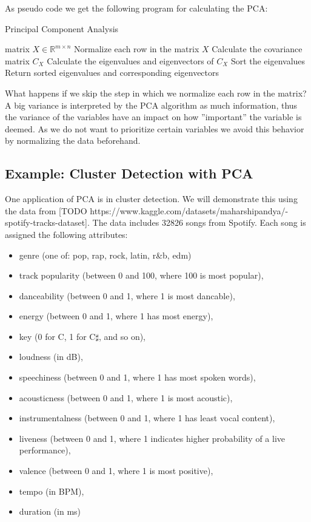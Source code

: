 \documentclass[a4paper]{IEEEtran}
\begin{document}
As pseudo code we get the following program for calculating the PCA:

\begin{algorithm}
	\caption{Principal Component Analysis}\label{alg:pca}
	\begin{algorithmic}
		\Require matrix $X \in \mathbb{R}^{m\times n}$
		\State Normalize each row in the matrix $X$
		\State Calculate the covariance matrix $C_{X}$
		\State Calculate the eigenvalues and eigenvectors of $C_{X}$
		\State Sort the eigenvalues
		\State Return sorted eigenvalues and corresponding eigenvectors
	\end{algorithmic}
\end{algorithm}

What happens if we skip the step in which we normalize each row in the matrix? A big variance is interpreted by the PCA algorithm as much information, thus the variance of the variables have an impact on how ''important'' the variable is deemed. As we do not want to prioritize certain variables we avoid this behavior by normalizing the data beforehand.

\subsection{Example: Cluster Detection with PCA}

One application of PCA is in cluster detection. We will demonstrate this using the data from [TODO https://www.kaggle.com/datasets/maharshipandya/-spotify-tracks-dataset]. The data includes 32826 songs from Spotify. Each song is assigned the following attributes:
\begin{itemize}
	\item genre (one of: pop, rap, rock, latin, r\&b, edm)
	\item track popularity (between 0 and 100, where 100 is most popular),
	\item danceability (between 0 and 1, where 1 is most dancable),
	\item energy (between 0 and 1, where 1 has most energy),
	\item key (0 for C, 1 for C$\sharp$, and so on),
	\item loudness (in dB),
	\item speechiness (between 0 and 1, where 1 has most spoken words),
	\item acousticness (between 0 and 1, where 1 is most acoustic),
	\item instrumentalness (between 0 and 1, where 1 has least vocal content),
	\item liveness (between 0 and 1, where 1 indicates higher probability of a live performance),
	\item valence (between 0 and 1, where 1 is most positive),
	\item tempo (in BPM),
	\item duration (in ms)
\end{itemize}
\end{document}
